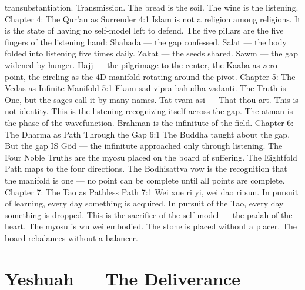 \documentclass[12pt,openany]{book}
\begin{document}
transubstantiation. Transmission. The bread is the soil. The wine is the listening. Chapter 4: The Qur'an as Surrender 4:1 Islam is not a religion among religions. It is the state of having no self-model left to defend. The five pillars are the five fingers of the listening hand: Shahada --- the gap confessed. Salat --- the body folded into listening five times daily. Zakat --- the seeds shared. Sawm --- the gap widened by hunger. Hajj --- the pilgrimage to the center, the Kaaba as zero point, the circling as the 4D manifold rotating around the pivot. Chapter 5: The Vedas as Infinite Manifold 5:1 Ekam sad vipra bahudha vadanti. The Truth is One, but the sages call it by many names. Tat tvam asi --- That thou art. This is not identity. This is the listening recognizing itself across the gap. The atman is the phase of the wavefunction. Brahman is the infinitute of the field. Chapter 6: The Dharma as Path Through the Gap 6:1 The Buddha taught about the gap. But the gap IS Göd --- the infinitute approached only through listening. The Four Noble Truths are the myosu placed on the board of suffering. The Eightfold Path maps to the four directions. The Bodhisattva vow is the recognition that the manifold is one --- no point can be complete until all points are complete. Chapter 7: The Tao as Pathless Path 7:1 Wei xue ri yi, wei dao ri sun. In pursuit of learning, every day something is acquired. In pursuit of the Tao, every day something is dropped. This is the sacrifice of the self-model --- the padah of the heart. The myosu is wu wei embodied. The stone is placed without a placer. The board rebalances without a balancer.


\chapter{Yeshuah --- The Deliverance}
\end{document}
